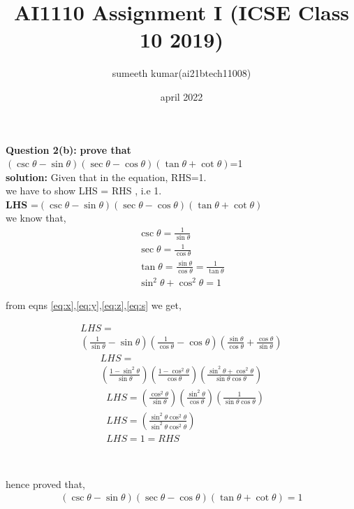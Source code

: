\documentclass[journel,11pt,two column]{IEEEtran}
\title{AI1110 Assignment I (ICSE Class 10 2019)}
\author{sumeeth kumar(ai21btech11008)}
\date{april 2022}
\begin{document}
\maketitle
\textbf{Question 2(b):}
 \textbf{ prove that}\\
  ${(\csc \theta - \sin \theta)(\sec \theta -\cos \theta)(\tan \theta +\cot \theta)}$=1 \\  
 \textbf{solution:}   Given that in the equation, RHS=1.\\ 
 we have to show LHS = RHS , i.e 1.\\ 
 \textbf{LHS} =$(\csc \theta - \sin \theta)(\sec \theta -\cos \theta)(\tan \theta +\cot \theta)$\\
 we know that,
 \begin{align}
 \label{eq:x}
 \csc\theta=\frac{1}{\sin\theta}\\[8pt]
 \label{eq:y}
  \sec\theta = \frac{1}{\cos \theta}\\[8pt]
  \label{eq:z}
  \tan\theta = \frac{\sin\theta}{\cos\theta}=\frac{1}{\tan \theta}\\[8pt]
  \label{eq:s}
  \sin^2\theta+\cos^2\theta=1
 \end{align}
 
 
 
 \begin{center}
  from eqns \eqref{eq:x},\eqref{eq:y},\eqref{eq:z},\eqref{eq:s} we get,\\[8pt]
 \end{center}
 \begin{multline}
     LHS=\\\left(\frac{1}{\sin\theta}-\sin\theta    \right)\left(\frac{1}{\cos\theta}-\cos\theta \right)\left(\frac{\sin\theta}{\cos\theta}+\frac{\cos\theta}{\sin\theta}\right)
 \end{multline}
 \begin{multline}
     LHS=\\\left(\frac{1-\sin^2\theta}{\sin\theta}\right)\left(\frac{1-\cos^2\theta}{\cos\theta}\right)\left(\frac{\sin^2\theta+\cos^2\theta}{\sin\theta \cos\theta}\right)
 \end{multline}
 \begin{align}
 &{LHS=\left(\frac{\cos^2\theta}{\sin\theta}\right)\left(\frac{\sin^2\theta}{\cos\theta}\right)\left(\frac{1}{\sin\theta \cos\theta}\right)}\\[8pt]
 &{LHS=\left(\frac{\sin^2\theta \cos^2\theta}{\sin^2\theta \cos^2\theta}\right)}\\[8pt]
 &{LHS=1=RHS}
\end{align}
\begin{center}
\\ [8pt]

\end{center}
 hence proved that,
\begin{align}
 {(\csc \theta - \sin \theta)(\sec \theta -\cos \theta)(\tan \theta +\cot \theta)}=1 
 \end{align}
\end{document}
